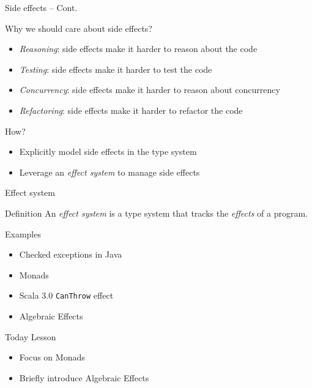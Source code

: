 \documentclass[presentation, 10pt]{beamer}\mode<presentation>{\usetheme{AMSBolognaFC}}
\begin{document}
\begin{frame}{Side effects -- Cont.}
\begin{exampleblock}{Why we should care about side effects?}
	\begin{itemize}
	\item \emph{Reasoning}: side effects make it harder to reason about the code
	\item \emph{Testing}: side effects make it harder to test the code
	\item \emph{Concurrency}: side effects make it harder to reason about concurrency
	\item \emph{Refactoring}: side effects make it harder to refactor the code
	\end{itemize}
\end{exampleblock}
\begin{alertblock}{How?}
	\begin{itemize}
		\item Explicitly model side effects in the type system
		\item Leverage an \emph{effect system} to manage side effects
	\end{itemize}
\end{alertblock}
\end{frame}

\begin{frame}{Effect system}
\begin{exampleblock}{Definition}
An \emph{effect system} is a type system that tracks the \emph{effects} of a program.
\end{exampleblock}
\begin{exampleblock}{Examples}
	\begin{itemize}
	\item Checked exceptions in Java
	\item Monads 
	\item Scala 3.0 \texttt{CanThrow} effect
	\item Algebraic Effects
	\end{itemize}
\end{exampleblock}
\begin{alertblock}{Today Lesson}
	\begin{itemize}
		\item Focus on Monads 
		\item Briefly introduce Algebraic Effects
	\end{itemize}
\end{alertblock}
\end{frame}
\end{document}
